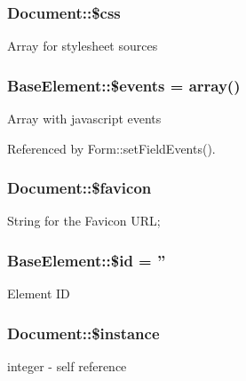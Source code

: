 \subsubsection[{\$css}]{\setlength{\rightskip}{0pt plus 5cm}Document::\$css}\label{classDocument_a635d9d19a754911129ac92e8b00f4f31}
Array for stylesheet sources 
\subsubsection[{\$events}]{\setlength{\rightskip}{0pt plus 5cm}BaseElement::\$events = array()}\label{classBaseElement_a02cebe45d277b4ff8f29db08bad371ba}
Array with javascript events 

Referenced by Form::setFieldEvents().

\subsubsection[{\$favicon}]{\setlength{\rightskip}{0pt plus 5cm}Document::\$favicon}\label{classDocument_ad74353c065d3fe06667bc549ed0977e7}
String for the Favicon URL; 
\subsubsection[{\$id}]{\setlength{\rightskip}{0pt plus 5cm}BaseElement::\$id = ''}\label{classBaseElement_a11b6989c43b53869a09f5ce65aa55b45}
Element ID 
\subsubsection[{\$instance}]{\setlength{\rightskip}{0pt plus 5cm}Document::\$instance}\label{classDocument_a2699d681667ea5a811ec6da1bf2a5087}
integer -\/ self reference 

